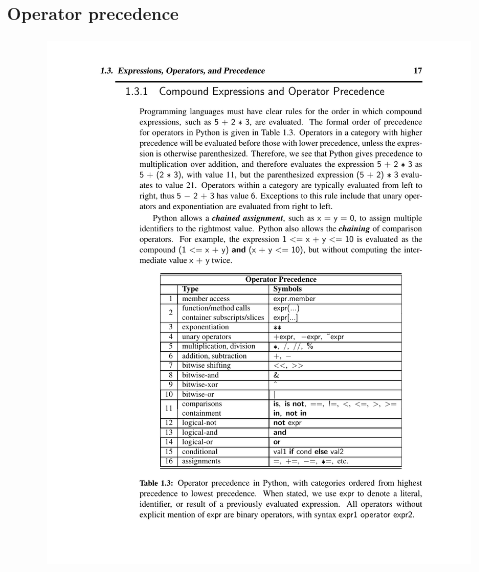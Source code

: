 \begin{frame}
    \frametitle{Operator precedence}

    \begin{figure}
        \centering
        \includegraphics[height = \textheight]{../images/figure-1.9_operator_precedence.pdf}
    \end{figure}

\end{frame}

\section{}

